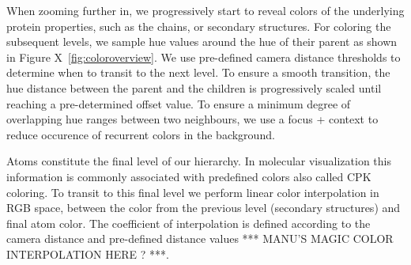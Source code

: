 \documentclass[review,journal]{vgtc}         %
\begin{document}
When zooming further in, we progressively start to reveal colors of the underlying protein properties, such as the chains, or secondary structures.
For coloring the subsequent levels, we sample hue values around the hue of their parent as shown in Figure X~\ref{fig:coloroverview}.
We use pre-defined camera distance thresholds to determine when to transit to the next level.
To ensure a smooth transition, the hue distance between the parent and the children is progressively scaled until reaching a pre-determined offset value.
To ensure a minimum degree of overlapping hue ranges between two neighbours, we use a focus + context to reduce occurence of recurrent colors in the background.

Atoms constitute the final level of our hierarchy.
In molecular visualization this information is commonly associated with predefined colors also called CPK coloring.
To transit to this final level we perform linear color interpolation in RGB space, between the color from the previous level (secondary structures) and final atom color.
The coefficient of interpolation is defined according to the camera distance and pre-defined distance values *** MANU'S MAGIC COLOR INTERPOLATION HERE ? ***.

%
%
%
%
%
\end{document}
